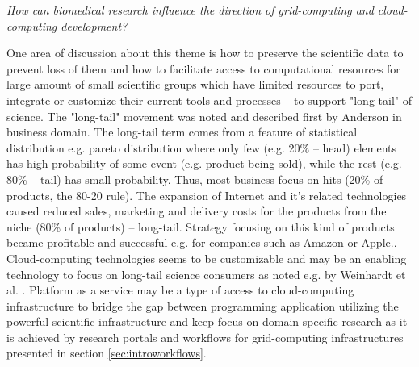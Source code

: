 \emph{How can biomedical research influence the direction of grid-computing and cloud-computing development?}

One area of discussion about this theme is how to preserve the scientific data to prevent loss of them \cite{Vines2014,P.BryanHeidorn2008} and how to facilitate access to computational resources for large amount of small scientific groups which have limited resources to port, integrate or customize their current tools and processes -- to support "long-tail" of science. The "long-tail" movement was noted and described first by Anderson \cite{Anderson2006} in business domain. %
The long-tail term comes from a feature of statistical distribution e.g. pareto distribution where only few (e.g. 20\% -- head) elements has high probability of some event (e.g. product being sold), while the rest (e.g. 80\% -- tail) has small probability. Thus, most business focus on hits (20\% of products, the 80-20 rule). The expansion of Internet and it's related technologies caused reduced sales, marketing and delivery costs for the products from the niche (80\% of products) -- long-tail. Strategy focusing on this kind of products became profitable and successful e.g. for companies such as Amazon or Apple.\cite{Anderson2006}. 
Cloud-computing technologies seems to be customizable and may be an enabling technology to focus on long-tail science consumers as noted e.g. by Weinhardt et al. \cite{Weinhardt2009}. Platform as a service may be a type of access to cloud-computing infrastructure to bridge the gap between programming application utilizing the powerful scientific infrastructure and keep focus on domain specific research as it is achieved by research portals and workflows for grid-computing infrastructures presented in section \ref{sec:introworkflows}.

